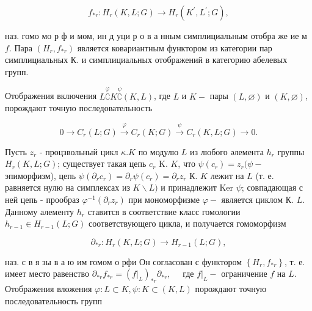 \documentclass[10pt]{article}
\begin{document}
\[

f_{* r}: H_{r}(K, L ; G) \rightarrow H_{r}\left(K^{\prime}, L^{\prime} ; G\right),

\]



наз. гомо мо р ф и мом, ин д уци р о в а нным симплициальным отобра же ие м $f$. Пара $\left(H_{r}, f_{* r}\right)$ является ковариантным функтором из категории пар симплициальных $К$. и симплициальных отображений в категорию абелевых групп.



Отображения включения $L \stackrel{\varphi}{\complement} K \stackrel{\psi}{\complement}(K, L)$, где $L$ и $K-$ пары $(L, \varnothing)$ и $(K, \varnothing)$, порождают точную последовательность



\[

0 \rightarrow C_{r}(L ; G) \stackrel{\varphi}{\longrightarrow} C_{r}(K ; G) \stackrel{\psi}{\longrightarrow} C_{r}(K, L ; G) \rightarrow 0 .

\]



Пусть $z_{r}$ - процзвольный цикл $\kappa . K$ по модулю $L$ из любого әлемента $h_{r}$ группы $H_{r}(K, L ; G)$; существует такая цепь $c_{r}$ K. $K$, что $\psi\left(c_{r}\right)=z_{r}(\psi-$ эпиморфизм), цепь $\psi\left(\partial_{r} c_{r}\right)=\partial_{r} \psi\left(c_{r}\right)=\partial_{r} z_{r}$ К. $K$ лежит на $L$ (т. е. равняется нулю на симплексах из $K \backslash L)$ и принадлежит Ker $\psi$; совпадающая с ней цепь - прообраз $\varphi^{-1}\left(\partial_{r} z_{r}\right)$ при мономорфизме $\varphi-$ является циклом К. $L$. Данному алементу $h_{r}$ ставится в соответствие класс гомологии $h_{r-1} \in H_{r-1}(L ; G)$ соответствующего цикла, и получается гомоморфизм



\[

\partial_{* r}: H_{r}(K, L ; G) \rightarrow H_{r-1}(L ; G),

\]



наз. с в я зы в а ю им гомом о рфи Он согласован с функтором $\left\{H_{r}, f_{* r}\right\}$, т. е. имеет место равенство $\partial_{* r} f_{* r}=\left(\left.f\right|_{L}\right)_{* r} \partial_{* r}, \quad$ где $\left.f\right|_{L}-$ ограничение $f$ на $L$. Отображения вложения $\varphi: L \subset K, \psi: K \subset(K, L)$ порождают точную последовательность групп
\end{document}
